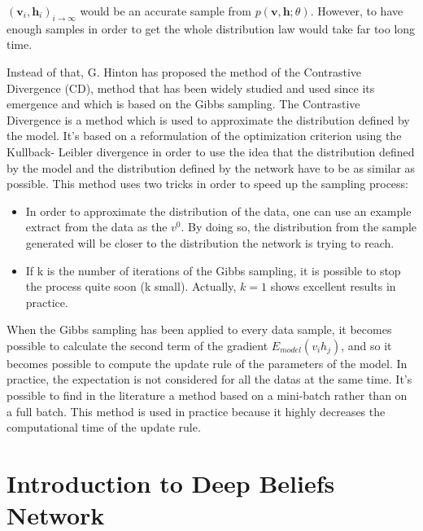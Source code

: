\documentclass{report}
\begin{document}
	
	$(\textbf{v}_i,\textbf{h}_i)_{i \rightarrow \infty}$ would be an accurate sample 
	from $p(\textbf{v}, \textbf{h}; \theta)$. However, to have enough samples in order 
	to get the whole distribution law would take far too long time.
	
	Instead of that, G. Hinton \cite{hinton2006fast} has proposed 
	the method of the Contrastive Divergence (CD), method that has been widely 
	studied and used since its emergence \cite{bengio2009justifying} and 
	which is based on the Gibbs sampling. The Contrastive Divergence is a method 
	which is used to approximate the distribution defined by the model. It's based 
	on a reformulation of the optimization criterion using the Kullback- Leibler 
	divergence in order to use the idea that the distribution defined by the model 
	and the distribution defined by the network have to be as similar as possible. 
	This method uses two tricks in order to speed up the sampling process:
	
	\begin{itemize} 
	
		\item In order to approximate the distribution of the data, one can use an 
	example extract from the data as the $v^0$. By doing so, the distribution from 
	the sample generated will be closer to the distribution the network is trying 
	to reach. 
	
		\item If k is the number of iterations of the Gibbs sampling, it is possible to 
	stop the process quite soon (k small). Actually, $k=1$ shows excellent results 
	in practice. 
	
	\end{itemize}
	When the Gibbs sampling has been applied to every data sample, it becomes 
	possible to calculate the second term of the gradient $E_{model}(v_i h_j)$, and 
	so it becomes possible to compute the update rule of the parameters of the 
	model. In practice, the expectation is not considered for all the datas at the 
	same time. It's possible to find in the literature 
	\cite{hinton2010practical} a method based on a mini-batch rather than on 
	a full batch. This method is used in practice because it highly decreases the 
	computational time of the update rule.
	
	\section{Introduction to Deep Beliefs Network}
	
\end{document}

